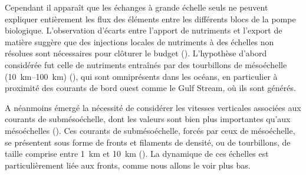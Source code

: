 Cependant il apparaît que les échanges à grande échelle seuls ne peuvent expliquer entièrement les flux des éléments entre les différents blocs de la pompe biologique.
L'observation d'écarts entre l'apport de nutriments et l'export de matière  suggère que des injections locales de nutriments à des échelles non résolues sont nécessaires pour clôturer le budget (\cite{mcgillicuddy_1998,oschlies_2002}).
L'hypothèse d'abord considérée fut celle de nutriments entraînés par des tourbillons de mésoéchelle (\qtyrange{10}{100}{\km}) (\cite{mcgillicuddy_2016}), qui sont omniprésents dans les océans, en particulier à proximité des courants de bord ouest comme le Gulf Stream, où ils sont générés.

A néanmoins émergé la nécessité de considérer les vitesses verticales associées aux courants de submésoéchelle, dont les valeurs sont bien plus importantes qu'aux mésoéchelles (\cite{klein_2009}).
Ces courants de submésoéchelle, forcés par ceux de mésoéchelle, se présentent sous forme de fronts et filaments de densité, ou de tourbillons, de taille comprise entre \qty{1}{\km} et \qty{10}{\km} ().
La dynamique de ces échelles est particulièrement liée aux fronts, comme nous allons le voir plus bas.

\begin{figure}
  \centering
  \label{fig:finescales-photos}
\end{figure}

